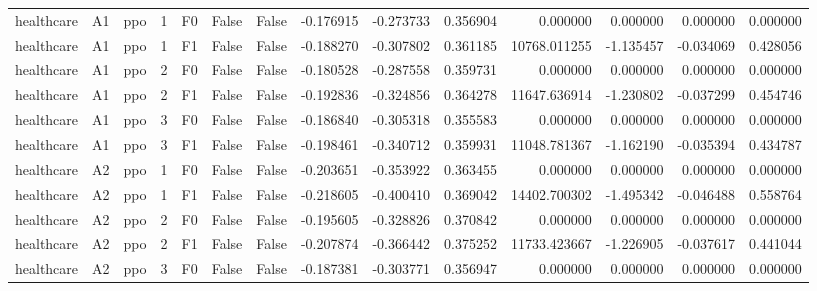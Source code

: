 \begin{tabular}{lllrlllrrrrrrr}
healthcare &      A1 &       ppo &     1 &  F0 &           False &            False & -0.176915 & -0.273733 & 0.356904 &         0.000000 &           0.000000 &        0.000000 &            0.000000 \\
healthcare &      A1 &       ppo &     1 &  F1 &           False &            False & -0.188270 & -0.307802 & 0.361185 &     10768.011255 &          -1.135457 &       -0.034069 &            0.428056 \\
healthcare &      A1 &       ppo &     2 &  F0 &           False &            False & -0.180528 & -0.287558 & 0.359731 &         0.000000 &           0.000000 &        0.000000 &            0.000000 \\
healthcare &      A1 &       ppo &     2 &  F1 &           False &            False & -0.192836 & -0.324856 & 0.364278 &     11647.636914 &          -1.230802 &       -0.037299 &            0.454746 \\
healthcare &      A1 &       ppo &     3 &  F0 &           False &            False & -0.186840 & -0.305318 & 0.355583 &         0.000000 &           0.000000 &        0.000000 &            0.000000 \\
healthcare &      A1 &       ppo &     3 &  F1 &           False &            False & -0.198461 & -0.340712 & 0.359931 &     11048.781367 &          -1.162190 &       -0.035394 &            0.434787 \\
healthcare &      A2 &       ppo &     1 &  F0 &           False &            False & -0.203651 & -0.353922 & 0.363455 &         0.000000 &           0.000000 &        0.000000 &            0.000000 \\
healthcare &      A2 &       ppo &     1 &  F1 &           False &            False & -0.218605 & -0.400410 & 0.369042 &     14402.700302 &          -1.495342 &       -0.046488 &            0.558764 \\
healthcare &      A2 &       ppo &     2 &  F0 &           False &            False & -0.195605 & -0.328826 & 0.370842 &         0.000000 &           0.000000 &        0.000000 &            0.000000 \\
healthcare &      A2 &       ppo &     2 &  F1 &           False &            False & -0.207874 & -0.366442 & 0.375252 &     11733.423667 &          -1.226905 &       -0.037617 &            0.441044 \\
healthcare &      A2 &       ppo &     3 &  F0 &           False &            False & -0.187381 & -0.303771 & 0.356947 &         0.000000 &           0.000000 &        0.000000 &            0.000000 \\

\end{tabular}
